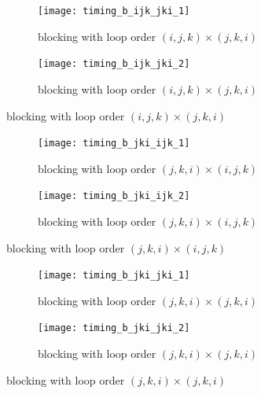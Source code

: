 \documentclass[12pt]{article}
\numberwithin{equation}{section}
\begin{document}
\begin{figure}[!ht]
   \begin{subfigure}
      \centering
        \begin{center}
      \texttt{[image: timing\_b\_ijk\_jki\_1]}
        \end{center}
      \label{aload0}
      \caption{blocking with loop order $(i, j, k)\times(j, k, i)$}
  \end{subfigure}
  \begin{subfigure}
      \centering
        \begin{center}
      \texttt{[image: timing\_b\_ijk\_jki\_2]}
        \end{center}
      \label{aload1}
      \caption{blocking with loop order $(i, j, k)\times(j, k, i)$}
  \end{subfigure}

\end{figure}

\begin{figure}[!ht]
   \begin{subfigure}
      \centering
        \begin{center}
      \texttt{[image: timing\_b\_jki\_ijk\_1]}
        \end{center}
      \label{aload0}
      \caption{blocking with loop order $(j, k, i)\times(i, j, k)$}
  \end{subfigure}
  \begin{subfigure}
      \centering
        \begin{center}
      \texttt{[image: timing\_b\_jki\_ijk\_2]}
        \end{center}
      \label{aload1}
      \caption{blocking with loop order $(j, k, i)\times(i, j, k)$}
  \end{subfigure}

\end{figure}

\begin{figure}[!ht]
   \begin{subfigure}
      \centering
        \begin{center}
      \texttt{[image: timing\_b\_jki\_jki\_1]}
        \end{center}
      \label{aload0}
      \caption{blocking with loop order $(j, k, i)\times(j, k, i)$}
  \end{subfigure}
  \begin{subfigure}
      \centering
        \begin{center}
      \texttt{[image: timing\_b\_jki\_jki\_2]}
        \end{center}
      \label{aload1}
      \caption{blocking with loop order $(j, k, i)\times(j, k, i)$}
  \end{subfigure}

\end{figure}
\end{document}
